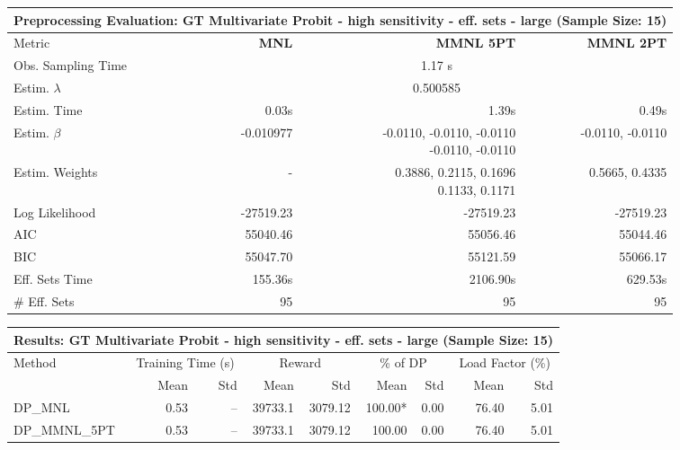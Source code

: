
\begin{samepage}
\begin{center}
  \small
  \begin{tabular}{l|r|r|r}
    \toprule
    \multicolumn{4}{c}{\textbf{Preprocessing Evaluation: GT Multivariate Probit - high sensitivity - eff. sets - large (Sample Size: 15)}} \\
    \midrule
    Metric & \textbf{MNL} & \textbf{MMNL 5PT} & \textbf{MMNL 2PT} \\
    \midrule
    Obs. Sampling Time & \multicolumn{3}{c}{1.17 s} \\
    Estim. $\lambda$ & \multicolumn{3}{c}{0.500585} \\
    Estim. Time & 0.03s & 1.39s & 0.49s \\
    Estim. $\beta$ & -0.010977 & \makecell[tr]{-0.0110, -0.0110, -0.0110 \\ -0.0110, -0.0110} & -0.0110, -0.0110 \\
    Estim. Weights & - & \makecell[tr]{0.3886, 0.2115, 0.1696 \\ 0.1133, 0.1171} & 0.5665, 0.4335 \\
    Log Likelihood & -27519.23 & -27519.23 & -27519.23 \\
    AIC & 55040.46 & 55056.46 & 55044.46 \\
    BIC & 55047.70 & 55121.59 & 55066.17 \\
    Eff. Sets Time & 155.36s & 2106.90s & 629.53s \\
    \# Eff. Sets & 95 & 95 & 95 \\
    \bottomrule
  \end{tabular}
\end{center}
\begin{center}
  \small
  \begin{tabular}{l|rr|rr|rr|rr}
    \toprule
    \multicolumn{9}{c}{\textbf{Results: GT Multivariate Probit - high sensitivity - eff. sets - large (Sample Size: 15)}} \\
    \midrule
    Method & \multicolumn{2}{c|}{Training Time (s)} & \multicolumn{2}{c|}{Reward} & \multicolumn{2}{c|}{\% of DP} & \multicolumn{2}{c}{Load Factor (\%)} \\
    & Mean & Std & Mean & Std & Mean & Std & Mean & Std \\
    \midrule
    DP\_MNL      &     0.53 &    -- &    39733.1 &    3079.12 & 100.00* &    0.00 &   76.40 &    5.01 \\
    DP\_MMNL\_5PT &     0.53 &    -- &    39733.1 &    3079.12 &  100.00 &    0.00 &   76.40 &    5.01 \\

\end{tabular}
\end{center}
\end{samepage}
